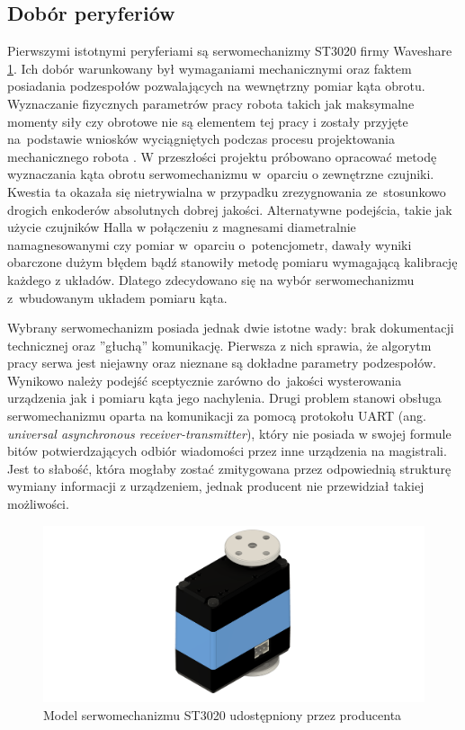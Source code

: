 \subsection{Dobór peryferiów}
Pierwszymi istotnymi peryferiami są serwomechanizmy ST3020 firmy Waveshare \ref{fig: st3020}. Ich dobór warunkowany był wymaganiami mechanicznymi oraz faktem posiadania podzespołów pozwalających na wewnętrzny pomiar kąta obrotu. Wyznaczanie fizycznych parametrów pracy robota takich jak maksymalne momenty siły czy obrotowe nie są elementem tej pracy i zostały przyjęte na~podstawie wniosków wyciągniętych podczas procesu projektowania mechanicznego robota \cite{gizmo}. W przeszłości projektu próbowano opracować metodę wyznaczania kąta obrotu serwomechanizmu w~oparciu o zewnętrzne czujniki. Kwestia ta okazała się nietrywialna w przypadku zrezygnowania ze~stosunkowo drogich enkoderów absolutnych dobrej jakości. Alternatywne podejścia, takie jak użycie czujników Halla w połączeniu z magnesami diametralnie namagnesowanymi czy pomiar w~oparciu o~potencjometr, dawały wyniki obarczone dużym błędem bądź stanowiły metodę pomiaru wymagającą kalibrację każdego z układów. Dlatego zdecydowano się na wybór serwomechanizmu z~wbudowanym układem pomiaru kąta. 

Wybrany serwomechanizm posiada jednak dwie istotne wady: brak dokumentacji technicznej oraz ''głuchą'' komunikację. Pierwsza z nich sprawia, że algorytm pracy serwa jest niejawny oraz nieznane są dokładne parametry podzespołów. Wynikowo należy podejść sceptycznie zarówno do~jakości wysterowania urządzenia jak i pomiaru kąta jego nachylenia. Drugi problem stanowi obsługa serwomechanizmu oparta na komunikacji za pomocą protokołu UART (ang. \textit{universal asynchronous receiver-transmitter}), który nie posiada w swojej formule bitów potwierdzających odbiór wiadomości przez inne urządzenia na magistrali. Jest to słabość, która mogłaby zostać zmitygowana przez odpowiednią strukturę wymiany informacji z urządzeniem, jednak producent nie przewidział takiej możliwości. 

\begin{figure}[ht!]
    \centering
    \includegraphics[width=0.7\linewidth]{rysunki/gizmo/ST3020.png}
    \caption{Model serwomechanizmu ST3020 udostępniony przez producenta}
    \label{fig: st3020}
\end{figure} 

